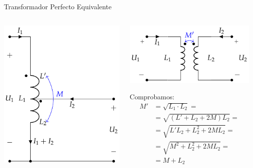 \documentclass[aspectratio=169, usenames,svgnames,dvipsnames]{beamer}
\begin{document}
\begin{frame}[label={sec:orgb0f93c2}]{Transformador Perfecto Equivalente}
\begin{columns}
\begin{column}{0.5\columnwidth}
\begin{center}
\includegraphics[height=0.6\textheight]{../figs/AutotrafoPerfecto.pdf}
\end{center}
\end{column}
\begin{column}{0.5\columnwidth}
\begin{center}
\includegraphics[height=0.33\textheight]{../figs/AutoTrafo_TrafoPerfecto.pdf}
\end{center}

Comprobamos:
\begin{align*}
  M' &= \sqrt{L_1 \cdot L_2} = \\
     &= \sqrt{(L' + L_2 + 2M) L_2} =\\
     &= \sqrt{L'L_2 + L_2^2 + 2ML_2} =\\
     &= \sqrt{M^2 + L_2^2 + 2ML_2} = \\
     &= M + L_2
\end{align*}
\end{column}
\end{columns}
\end{frame}
\end{document}
